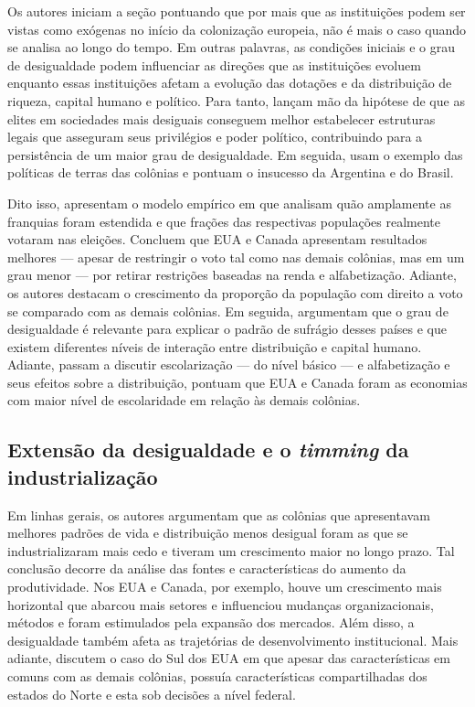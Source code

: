  Os autores iniciam a seção pontuando que por mais que as instituições podem ser vistas como exógenas no início da colonização europeia, não é mais o caso quando se analisa ao longo do tempo. Em outras palavras, as condições iniciais e o grau de desigualdade podem influenciar as direções que as instituições evoluem enquanto essas instituições afetam a evolução das dotações e da distribuição de riqueza, capital humano e político. Para tanto, lançam mão da hipótese de que as elites em sociedades mais desiguais conseguem melhor estabelecer estruturas legais que asseguram seus privilégios e poder político, contribuindo para a persistência de um maior grau de desigualdade. Em seguida, usam o exemplo das políticas de terras das colônias e pontuam o insucesso da Argentina e do Brasil. 
 
 Dito isso, apresentam o modelo empírico em que analisam quão amplamente as franquias foram estendida e que frações das respectivas populações realmente votaram nas eleições. Concluem que EUA e Canada apresentam resultados melhores --- apesar de restringir o voto tal como nas demais colônias, mas em um grau menor --- por retirar restrições baseadas na renda e alfabetização. Adiante, os autores destacam o crescimento da proporção da população com direito a voto se comparado com as demais colônias. Em seguida, argumentam que o grau de desigualdade é relevante para explicar o padrão de sufrágio desses países e que existem diferentes níveis de interação entre distribuição e capital humano. Adiante, passam a discutir escolarização --- do nível básico --- e alfabetização e seus efeitos sobre a distribuição, pontuam que EUA e Canada foram as economias com maior nível de escolaridade em relação às demais colônias.
 
\subsection*{Extensão da desigualdade e o \textit{timming} da industrialização}
 
 Em linhas gerais, os autores argumentam que as colônias que apresentavam melhores padrões de vida e distribuição menos desigual foram as que se industrializaram mais cedo e tiveram um crescimento maior no longo prazo. Tal conclusão decorre da análise das fontes e características do aumento da produtividade. Nos EUA e Canada, por exemplo, houve um crescimento mais horizontal que abarcou mais setores e influenciou mudanças organizacionais, métodos e foram estimulados pela expansão dos mercados. Além disso, a desigualdade também afeta as trajetórias de desenvolvimento institucional. Mais adiante, discutem o caso do Sul dos EUA em que apesar das características em comuns com as demais colônias, possuía características compartilhadas dos estados do Norte e esta sob decisões a nível federal.
 
